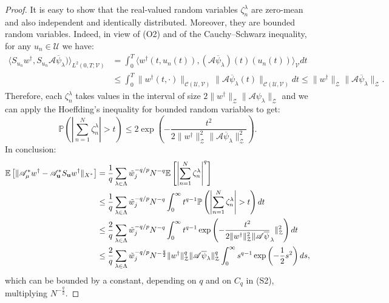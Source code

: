 \documentclass[11pt,a4paper]{article}
\numberwithin{equation}{section}
\newcommand{\Prob}{\mathbb{P}}
\newcommand{\bu}{{\bf u}}
\newcommand{\cAbu}{\mathscr{A}_{\bu}}
\newcommand{\cA}{\mathscr{A}}
\newcommand{\cAm}{\mathscr{A}_\mu}
\newcommand{\Sbu}{S_{{\bu}}}
\newcommand{\E}{\mathbb{E}}
\begin{document}
\begin{proof}
It is easy to show that the real-valued random variables $\zeta^{\lambda}_n$ are zero-mean and also independent and identically distributed. Moreover, they are bounded random variables. Indeed, in view  of (O2) and of the Cauchy--Schwarz inequality, for any $u_n \in \mathcal{U}$
we have:
\begin{equation*}
\begin{aligned}
    \langle S_{u_n} w^\dag, S_{u_n} \cA \overline{\psi}_\lambda) \rangle_{L^2(0,T;\mathcal{V})} &= \int_0^T \langle w^\dag(t,u_n(t)) ,(\cA \overline{\psi}_\lambda)(t)(u_n(t)) \rangle_{\mathcal{V}} dt \\
    & \leq \int_0^T \| w^\dag(t,\cdot) \|_{\mathcal{C}(\mathcal{U},\mathcal{V})} \| \cA \overline{\psi}_\lambda (t)\|_{\mathcal{C}(\mathcal{U},\mathcal{V})} dt 
    \leq \| w^\dag \|_\mathcal{Z} \| \cA \overline{\psi}_\lambda \|_\mathcal{Z}.
\end{aligned}
\end{equation*}
Therefore, each $\zeta_n^\lambda$ takes values in the interval of size $2 \| w^\dag \|_\mathcal{Z} \| \cA \psi_\lambda \|_\mathcal{Z}$ and we can apply the Hoeffding's inequality for bounded random variables to get:
\[
\Prob\left( \left| \sum_{n=1}^N \zeta_n^\lambda \right| > t \right) \leq 2 \exp \left( -\frac{t^2}{2 \|w^\dag\|_\mathcal{Z}^2 \| \cA \overline{\psi}_\lambda\|_\mathcal{Z}^2}\right).
\]
In conclusion:
\[
\begin{aligned}
\E\left[\| \cAm^*w^\dag - \cAbu^* \Sbu w^\dag \|_{X^*}\right]
&= \frac{1}{q} \sum_{\lambda \in \Lambda} \tilde{w}_j^{-q/p} N^{-q} \E \left[ \left| \sum_{n=1}^N \zeta_n^\lambda \right|^q \right]  \\
& \leq \frac{1}{q} \sum_{\lambda \in \Lambda} \tilde{w}_j^{-q/p} N^{-q} \int_0^\infty t^{q-1} \Prob \left( \left| \sum_{n=1}^N \zeta_n^\lambda \right| > t \right)dt \\
& \leq \frac{2}{q} \sum_{\lambda \in \Lambda} \tilde{w}_j^{-q/p} N^{-q} \int_0^\infty t^{q-1} \exp \left( -\frac{t^2}{2 \|w^\dag\|_\mathcal{Z}^2 \| \cA \overline{\psi}}_\lambda\|_\mathcal{Z}^2\right) dt \\
& \leq \frac{2}{q} \sum_{\lambda \in \Lambda} \tilde{w}_j^{-q/p} N^{-\frac{q}{2}} \|w^\dag\|_\mathcal{Z}^q \|\cA \overline{\psi}_\lambda\|_\mathcal{Z}^q \int_0^\infty s^{q-1}\exp\left( -\frac{1}{2}s^2\right) ds,
\end{aligned}
\]
which can be bounded 
by a constant, depending on $q$ and on $C_q$ in (S2), multiplying $N^{-\frac{q}{2}}$.
\end{proof}
\end{document}
